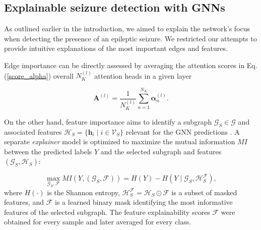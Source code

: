 \documentclass[a4paper,fleqn]{cas-sc}
\begin{document}


\subsection{Explainable seizure detection with GNNs}
As outlined earlier in the introduction, we aimed to explain the network's focus when detecting the presence of an epileptic seizure. We restricted our attempts to provide intuitive explanations of the most important edges and features.

Edge importance can be directly assessed by averaging the attention scores in Eq. (\ref{score_alpha}) overall $N_K^{(l)}$ attention heads in a given layer 

\begin{equation} \label{edge_explain}
    \mathbf{A}^{(l)} = \frac{1}{N_K^{(l)}} \sum_{n=1}^{N_K}  \bm{\alpha}_{n}^{(l)}.
\end{equation}

On the other hand, feature importance aims to identify a subgraph $\mathcal{G}_{S} \in \mathcal{G}$ and associated features $\mathcal{H}_{S} = \{ \mathbf{h}_i \mid i \in \mathcal{V}_{S} \}$ relevant for the GNN predictions \cite{Ying2019GnnX}. A separate \textit{explainer} model is optimized to maximize the mutual information $MI$ between the predicted labels $Y$ and the selected subgraph and features $(\mathcal{G}_S,\mathcal{H}_S)$: 

\begin{equation}\label{mutual_info}
    \max_{\mathcal{G}_{S}, \mathcal{F}} MI(Y, (\mathcal{G}_{S}, \mathcal{F})) = H(Y) - H(Y \mid \mathcal{G}_{S}, \mathcal{H}_{S}^\mathcal{F}),
\end{equation}
where $H(\cdot)$ is the Shannon entropy, $\mathcal{H}_{S}^\mathcal{F} = \mathcal{H}_{S} \odot \mathcal{F}$ is a subset of masked features, and $\mathcal{F}$ is a learned binary mask identifying the most informative features of the selected subgraph.
The feature explainability scores $\mathcal{F}$ were obtained for every sample and later averaged for every class. 
\end{document}
